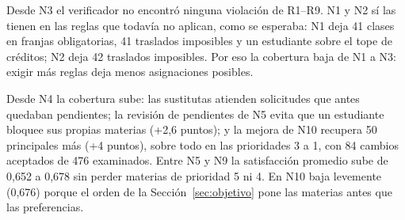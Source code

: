 \begin{tableorg}[htbp]
\centering
\caption{Resultados por nivel en la instancia de 250 estudiantes}\label{tab:resultados-niveles}
\tablebodyfont
{}
\end{tableorg}

Desde N3 el verificador no encontró ninguna violación de R1--R9. N1 y N2 sí las tienen en las reglas que todavía no aplican, como se esperaba: N1 deja 41 clases en franjas obligatorias, 41 traslados imposibles y un estudiante sobre el tope de créditos; N2 deja 42 traslados imposibles. Por eso la cobertura baja de N1 a N3: exigir más reglas deja menos asignaciones posibles.

Desde N4 la cobertura sube: las sustitutas atienden solicitudes que antes quedaban pendientes; la revisión de pendientes de N5 evita que un estudiante bloquee sus propias materias (+2,6 puntos); y la mejora de N10 recupera 50 principales más (+4 puntos), sobre todo en las prioridades 3 a 1, con 84 cambios aceptados de 476 examinados. Entre N5 y N9 la satisfacción promedio sube de 0,652 a 0,678 sin perder materias de prioridad 5 ni 4. En N10 baja levemente (0,676) porque el orden de la Sección~\ref{sec:objetivo} pone las materias antes que las preferencias.

